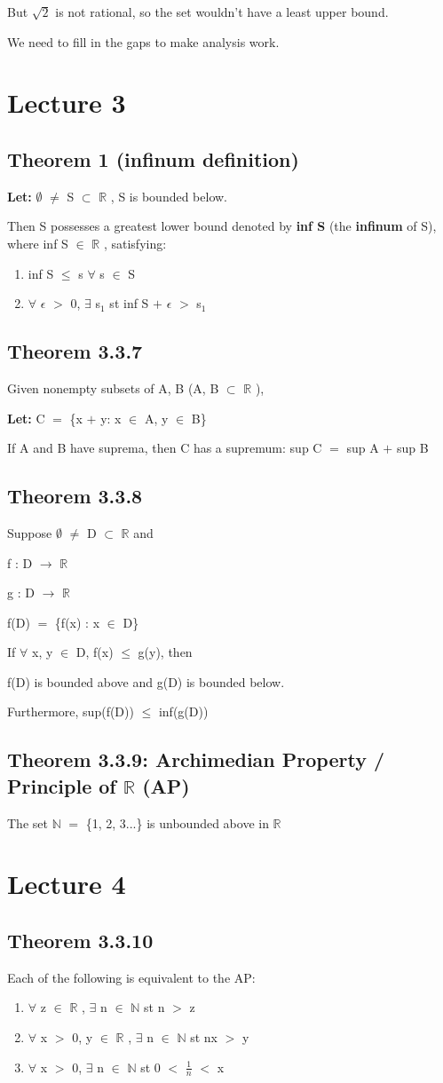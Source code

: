 \documentclass{article}
\newcommand{\mt}[1]{\ensuremath{#1}}
\newcommand\bsc[2][\DefaultOpt]{%
  \def\DefaultOpt{#2}%
  \section[#1]{#2}%
}
\newcommand\ssc[2][\DefaultOpt]{%
  \def\DefaultOpt{#2}%
  \subsection[#1]{#2}%
}
\newcommand{\balist}{\begin{enumerate}[label=\alph*.]}
\newcommand{\elist}{\end{enumerate}}
\newcommand{\bilist}{\begin{enumerate}[label=\roman*)]}
\newcommand{\lt}[1]{\textbf{Let: } #1}
\newcommand{\br}{\mt{\mathbb{R}} }       %
\newcommand{\bn}{\mt{\mathbb{N}} }       %
\newcommand{\ep}{\mt{\epsilon} }         %
\newcommand{\fa}{\mt{\forall} }          %
\newcommand{\mem}{\mt{\in} }
\newcommand{\exs}{\mt{\exists} }
\newcommand{\es}{\mt{\emptyset} }        %
\newcommand{\sbs}{\mt{\subset} }         %
\newcommand{\lra}{ \mt{\longrightarrow} } %
\newcommand{\eql}{\mt{=} }
\newcommand{\uw}[2]{#1\mt{_{#2}}}
\newcommand{\frc}[2]{\mt{\frac{#1}{#2}}}
\begin{document}
{{

But $\sqrt{2}$ is not rational, so the set wouldn't have a least upper bound.

We need to fill in the gaps to make analysis work.
}
\newpage

\bsc{Lecture 3}{

\ssc{Theorem 1 (infinum definition)}{

\lt{\es $\neq$ S \sbs \br, S is bounded below.}

Then S possesses a greatest lower bound denoted by \textbf{inf S} (the \textbf{infinum} of S), where inf S \mem \br, satisfying:

\bilist
\item inf S $\leq$ s \fa s \mem S
\item \fa \ep $>$ 0, \exs \uw{s}{1}  st  inf S $+$ \ep $>$ \uw{s}{1}
\elist
}

\ssc{Theorem 3.3.7}{

Given nonempty subsets of A, B (A, B \sbs \br),

\lt{C \eql \{x $+$ y: x \mem A, y \mem B\}}

If A and B have suprema, then C has a supremum: sup C \eql sup A $+$ sup B
}

\ssc{Theorem 3.3.8}{

Suppose \es $\neq$ D \sbs \br and 

f : D \lra \br

g : D \lra \br

f(D) \eql \{f(x) : x \mem D\}

If \fa x, y \mem D, f(x) $\leq$ g(y), then
 
f(D) is bounded above and g(D) is bounded below.

Furthermore, sup(f(D)) $\leq$ inf(g(D))
}

\ssc{Theorem 3.3.9: Archimedian Property / Principle of \br (AP)}{

The set \bn \eql \{1, 2, 3...\} is unbounded above in \br
}

}

\newpage

\bsc{Lecture 4}{

\ssc{Theorem 3.3.10}{

Each of the following is equivalent to the AP:

\balist
\item \fa z \mem \br, \exs n \mem \bn st n $>$ z
\item \fa x $>$ 0, y \mem \br, \exs n \mem \bn st nx $>$ y
\item \fa x $>$ 0, \exs n \mem \bn st 0 $<$ \frc{1}{n} $<$ x
\elist
}

}}
\end{document}
